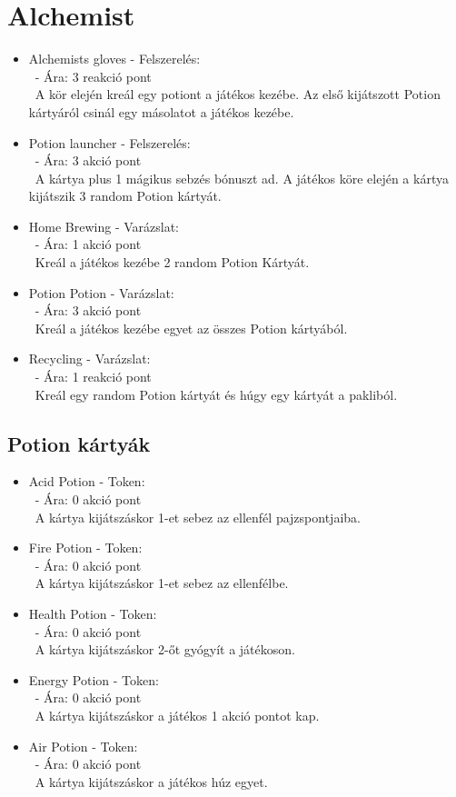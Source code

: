 \section{Alchemist}
\begin{itemize}
    \item Alchemists gloves - Felszerelés:\\\
    - Ára: 3 reakció pont \\\
    A kör elején kreál egy potiont a játékos kezébe. Az első kijátszott Potion kártyáról csinál egy másolatot a játékos kezébe.
    \item Potion launcher - Felszerelés:\\\
    - Ára: 3 akció pont \\\
     A kártya plus 1 mágikus sebzés bónuszt ad. A játékos köre elején a kártya kijátszik 3 random Potion kártyát.
    \item Home Brewing - Varázslat:\\\
    - Ára: 1 akció pont \\\
    Kreál a játékos kezébe 2 random Potion Kártyát. 
    \item Potion Potion - Varázslat:\\\
    - Ára: 3 akció pont \\\
    Kreál a játékos kezébe egyet az összes Potion kártyából.
    \item Recycling - Varázslat:\\\
    - Ára: 1 reakció pont \\\
    Kreál egy random Potion kártyát és húgy egy kártyát a pakliból.
\end{itemize}

\subsection{Potion kártyák}
\begin{itemize}
    \item Acid Potion - Token:\\\
    - Ára: 0 akció pont \\\
    A kártya kijátszáskor 1-et sebez az ellenfél pajzspontjaiba.
    \item Fire Potion - Token:\\\
    - Ára: 0 akció pont \\\
    A kártya kijátszáskor 1-et sebez az ellenfélbe.
    \item Health Potion - Token:\\\
    - Ára: 0 akció pont \\\
    A kártya kijátszáskor 2-őt gyógyít a játékoson.
    \item Energy Potion - Token:\\\
    - Ára: 0 akció pont \\\
    A kártya kijátszáskor a játékos 1 akció pontot kap.
    \item Air Potion - Token:\\\
    - Ára: 0 akció pont \\\
    A kártya kijátszáskor a játékos húz egyet.
\end{itemize}